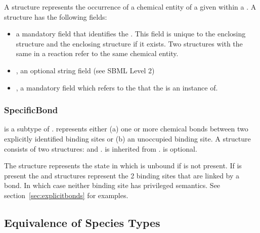 \documentclass{cekarticle}
\begin{document}
A  structure represents the occurrence of a chemical entity of a given
 within a .  A  structure has the
following fields:

\begin{itemize}

\item {} a mandatory  field that identifies
the . This field is unique to the
enclosing  structure and the enclosing
 structure if it exists.  Two
 structures with the same 
in a reaction refer to the same chemical entity.

\item {}, an optional string field (see SBML Level 2)

\item {}, a mandatory  field which
refers to the  that the
 is an instance of.

\end{itemize}

\subsubsection{SpecificBond}

 is a subtype of .
 represents either (a) one or more chemical
bonds between two explicitly identified binding sites or (b) an
unoccupied binding site.  A  structure consists of two
 structures:
 and
. 
is inherited from . 
is optional.

The  structure represents the state in which
 is unbound if 
 is not present. If
 is present the
 and 
 structures represent the 2 binding sites
that are linked by a bond. In which case neither binding site has
privileged semantics. See section~\ref{sec:explicitbonds} for
examples.

\subsection{Equivalence of Species Types}
\label{sec:type-equals}
\end{document}
